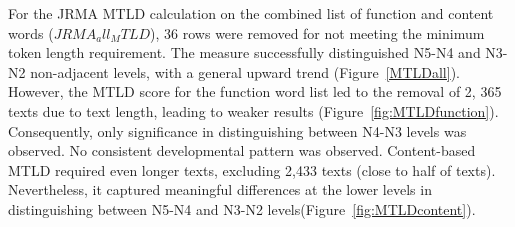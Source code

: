 
For the JRMA MTLD calculation on the combined list of function and content words ($JRMA_all_MTLD$), 36 rows were removed
for not
meeting the minimum token length requirement. The measure successfully distinguished N5-N4 and N3-N2 non-adjacent
levels, with a
general upward trend (Figure~\ref{MTLDall}). However, the MTLD score for the function word list led to the removal of 2,
365
texts due to
text length, leading to weaker results (Figure~\ref{fig:MTLDfunction}). Consequently, only significance in
distinguishing
between N4-N3
levels was observed. No consistent developmental pattern was observed. Content-based MTLD required even longer
texts, excluding 2,433 texts (close to half of texts). Nevertheless, it captured meaningful differences at the lower 
levels in distinguishing between N5-N4 and N3-N2 levels(Figure~\ref{fig:MTLDcontent}). 


